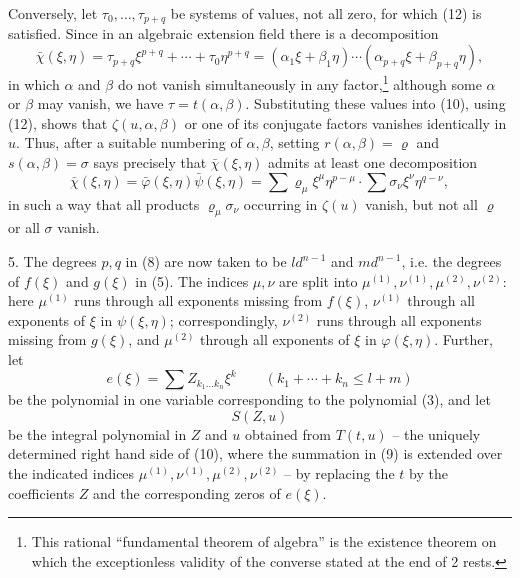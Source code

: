 \documentclass[11pt]{article}
\begin{document}
Conversely, let $\tau_0,\ldots,\tau_{p+q}$ be systems of values, not all zero, for which (12) is satisfied. Since in an algebraic extension field there is a decomposition
\begin{equation}
 \bar\chi(\xi,\eta)=\tau_{p+q}\xi^{p+q}+\cdots+\tau_0\eta^{p+q}
=(\alpha_1\xi+\beta_1\eta)\cdots(\alpha_{p+q}\xi+\beta_{p+q}\eta),
\tag{12'}
\end{equation}
in which $\alpha$ and $\beta$ do not vanish simultaneously in any factor,\footnote{This rational ``fundamental theorem of algebra'' is the existence theorem on which the exceptionless validity of the converse stated at the end of 2 rests.} although some $\alpha$ or $\beta$ may vanish, we have $\tau=t(\alpha,\beta)$. Substituting these values into (10), using (12), shows that $\zeta(u,\alpha,\beta)$ or one of its conjugate factors vanishes identically in $u$. Thus, after a suitable numbering of $\alpha,\beta$, setting $r(\alpha,\beta)=\varrho$ and $s(\alpha,\beta)=\sigma$ says precisely that $\bar\chi(\xi,\eta)$ admits at least one decomposition
\begin{equation}
\bar\chi(\xi,\eta)=\bar\varphi(\xi,\eta)\bar\psi(\xi,\eta)
=\sum \varrho_\mu\xi^\mu\eta^{p-\mu}\cdot\sum \sigma_\nu\xi^\nu\eta^{q-\nu},
\tag{13}
\end{equation}
in such a way that all products $\varrho_\mu\sigma_\nu$ occurring in $\zeta(u)$ vanish, but not all $\varrho$ or all $\sigma$ vanish.

5. The degrees $p,q$ in (8) are now taken to be $ld^{n-1}$ and $md^{n-1}$, i.e. the degrees of $f(\xi)$ and $g(\xi)$ in (5). The indices $\mu,\nu$ are split into $\mu^{(1)},\nu^{(1)},\mu^{(2)},\nu^{(2)}$: here $\mu^{(1)}$ runs through all exponents missing from $f(\xi)$, $\nu^{(1)}$ through all exponents of $\xi$ in $\psi(\xi,\eta)$; correspondingly, $\nu^{(2)}$ runs through all exponents missing from $g(\xi)$, and $\mu^{(2)}$ through all exponents of $\xi$ in $\varphi(\xi,\eta)$. Further, let
\[
 e(\xi)=\sum Z_{k_1\ldots k_n}\xi^k\qquad(k_1+\cdots+k_n\le l+m)
\]
be the polynomial in one variable corresponding to the polynomial (3), and let
\[
 S(Z,u)
\]
be the integral polynomial in $Z$ and $u$ obtained from $T(t,u)$ -- the uniquely determined right hand side of (10), where the summation in (9) is extended over the indicated indices $\mu^{(1)},\nu^{(1)},\mu^{(2)},\nu^{(2)}$ -- by replacing the $t$ by the coefficients $Z$ and the corresponding zeros of $e(\xi)$.
\end{document}
